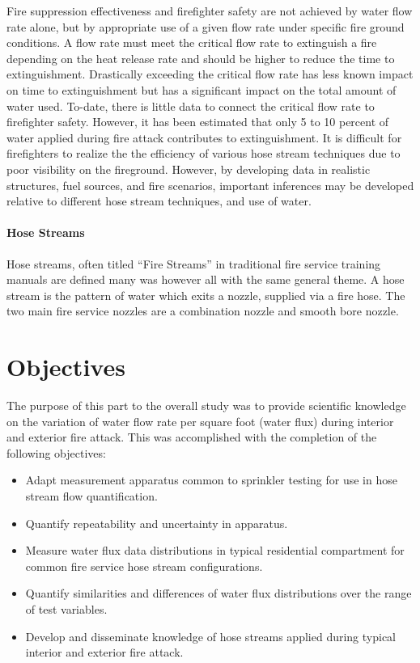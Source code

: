 \documentclass[12pt,oneside]{book}
\begin{document}
Fire suppression effectiveness and firefighter safety are not achieved by water flow rate alone, but by appropriate use of a given flow rate under specific fire ground conditions. A flow rate must meet the critical flow rate to extinguish a fire depending on the heat release rate and should be higher to reduce the time to extinguishment. Drastically exceeding the critical flow rate has less known impact on time to extinguishment but has a significant impact on the total amount of water used. To-date, there is little data to connect the critical flow rate to firefighter safety. However, it has been estimated that only 5 to 10 percent of water applied during fire attack contributes to extinguishment. It is difficult for firefighters to realize the the efficiency of various hose stream techniques due to poor visibility on the fireground. However, by developing data in realistic structures, fuel sources, and fire scenarios, important inferences may be developed relative to different hose stream techniques, and use of water.

\subsubsection*{Hose Streams} %
Hose streams, often titled ``Fire Streams'' in traditional fire service training manuals are defined many was however all with the same general theme. A hose stream is the pattern of water which exits a nozzle, supplied via a fire hose. The two main fire service nozzles are a combination nozzle and smooth bore nozzle. 

\chapter{Objectives}

The purpose of this part to the overall study was to provide scientific knowledge on the variation of water flow rate per square foot (water flux) during interior and exterior fire attack. This was accomplished with the completion of the following objectives:

\begin{itemize}
	\setlength{\itemindent}{0.25in}
	\item Adapt measurement apparatus common to sprinkler testing for use in hose stream flow quantification.
	\item Quantify repeatability and uncertainty in apparatus.
	\item Measure water flux data distributions in typical residential compartment for common fire service hose stream configurations.
	\item Quantify similarities and differences of water flux distributions over the range of test variables.
	\item Develop and disseminate knowledge of hose streams applied during typical interior and exterior fire attack.
	\end{itemize}
\end{document}
